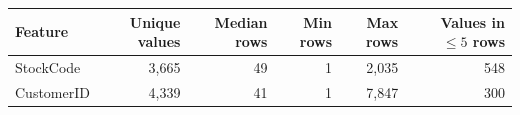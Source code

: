 \begin{tabular}{lrrrrr}
\toprule
Feature & Unique values & Median rows & Min rows & Max rows & Values in $\le 5$ rows \\
\midrule
StockCode & 3,665 & 49 & 1 & 2,035 & 548 \\
CustomerID & 4,339 & 41 & 1 & 7,847 & 300 \\
\bottomrule
\end{tabular}
